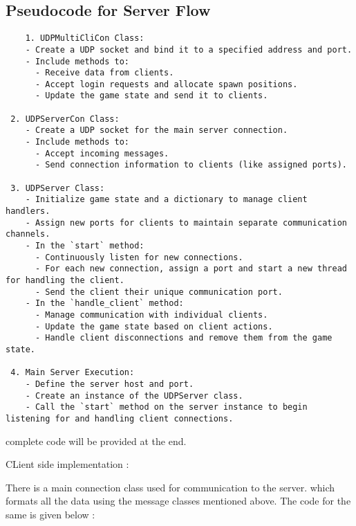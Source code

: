 \subsection{Pseudocode for Server Flow}
\begin{verbatim}
    1. UDPMultiCliCon Class:
    - Create a UDP socket and bind it to a specified address and port.
    - Include methods to:
      - Receive data from clients.
      - Accept login requests and allocate spawn positions.
      - Update the game state and send it to clients.
 
 2. UDPServerCon Class:
    - Create a UDP socket for the main server connection.
    - Include methods to:
      - Accept incoming messages.
      - Send connection information to clients (like assigned ports).
 
 3. UDPServer Class:
    - Initialize game state and a dictionary to manage client handlers.
    - Assign new ports for clients to maintain separate communication channels.
    - In the `start` method:
      - Continuously listen for new connections.
      - For each new connection, assign a port and start a new thread for handling the client.
      - Send the client their unique communication port.
    - In the `handle_client` method:
      - Manage communication with individual clients.
      - Update the game state based on client actions.
      - Handle client disconnections and remove them from the game state.
 
 4. Main Server Execution:
    - Define the server host and port.
    - Create an instance of the UDPServer class.
    - Call the `start` method on the server instance to begin listening for and handling client connections.
\end{verbatim}

complete code will be provided at the end.

CLient side implementation : 

There is a main connection class used for communication to the server. which formats all the data using the message classes mentioned above. The code for the same is given below :

